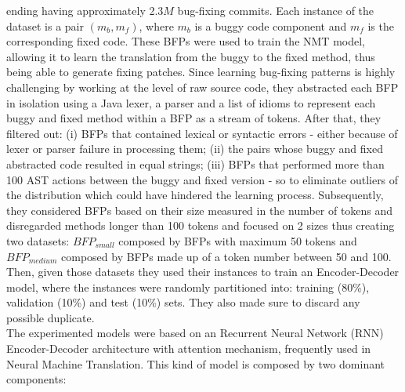 ending having approximately 2.3\(M\) bug-fixing commits.
Each instance of the dataset is a pair $(m_b, m_f)$, where $m_b$ is a buggy code component and $m_f$ is the
corresponding fixed code. These BFPs were used to train the NMT model, allowing it to learn the translation
from the buggy to the fixed method, thus being able to generate fixing patches. Since learning bug-fixing
patterns is highly challenging by working at the level of raw source code, they abstracted 
each BFP in isolation using a Java lexer, a parser and a list of idioms to represent each buggy and fixed method 
within a BFP as a stream of tokens. After that, they filtered out: (i) BFPs that contained lexical or syntactic 
errors - either because of lexer or parser failure in processing them; (ii) the pairs whose buggy 
and fixed abstracted code resulted in equal strings; (iii) BFPs that performed more than 100 AST actions between the buggy 
and fixed version - so to eliminate outliers of the distribution which could have hindered
the learning process. Subsequently, they considered BFPs based on their size measured
in the number of tokens and disregarded methods longer than 100 tokens and focused on 2 sizes thus creating 
two datasets: \(BFP_{small}\) composed by BFPs with maximum 50 tokens and \(BFP_{medium}\)
composed by BFPs made up of a token number between 50 and 100.
Then, given those datasets they used their instances to train an Encoder-Decoder
model, where the instances were randomly partitioned into: training (80\%), validation (10\%) and 
test (10\%) sets. They also made sure to discard any possible duplicate.\\
\newline
The experimented models were based on an Recurrent Neural Network (RNN) Encoder-Decoder
architecture with attention mechanism, frequently used in Neural Machine Translation. 
This kind of model is composed by two
dominant components:

